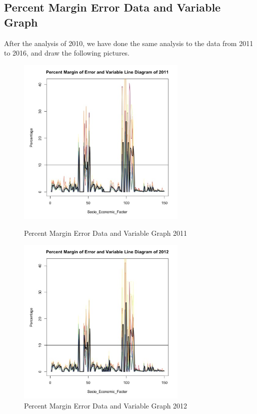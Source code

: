 \documentclass{mcmthesis}
\begin{document}
\begin{appendices}


\section{Percent Margin Error Data and Variable Graph}\label{Percent Margin Error Data and Variable Graph}
After the analysis of 2010, we have done the same analysis to the data from 2011 to 2016, and draw the following pictures.
\begin{figure}[H]
\centering
\begin{minipage}[t]{0.45\textwidth}
\centering
\includegraphics[width=3.2in]{figures/PercentMarginErrorDataGraphVariable2011.jpeg}
\caption{Percent Margin Error Data and Variable Graph 2011}
\label{Percent Margin Error Data and Variable Graph 2011}
\end{minipage}
\hfill
\begin{minipage}[t]{0.45\textwidth}
\centering
\includegraphics[width=3.2in]{figures/PercentMarginErrorDataGraphVariable2012.jpeg}
\caption{Percent Margin Error Data and Variable Graph 2012}
\label{Percent Margin Error Data and Variable Graph 2012}
\end{minipage}
\end{figure}


\end{appendices}
\end{document}
